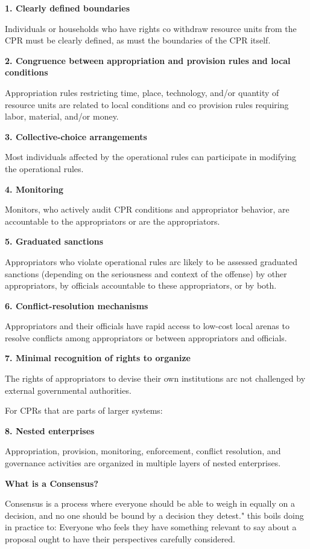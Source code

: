 \documentclass{article}
\begin{document}
\textbf{1. Clearly defined boundaries}

Individuals or households who have rights co withdraw resource units from the CPR must be clearly defined, as must the boundaries of the CPR itself.

\textbf{2. Congruence between appropriation and provision rules and local conditions}

 Appropriation rules restricting time, place, technology, and/or quantity of resource units are related to local conditions and co provision rules requiring labor, material, and/or money.

\textbf{3. Collective-choice arrangements}

Most individuals affected by the operational rules can participate in modifying the operational rules.

\textbf{4. Monitoring}

Monitors, who actively audit CPR conditions and appropriator behavior, are accountable to the appropriators or are the appropriators.

\textbf{5. Graduated sanctions}

Appropriators who violate operational rules arc likely to be assessed graduated sanctions (depending on the seriousness and context of the offense) by other appropriators, by officials accountable to these appropriators, or by both.

\textbf{6. Conflict-resolution mechanisms}

Appropriators and their officials have rapid access to low-cost local arenas to resolve conflicts among appropriators or between appropriators and officials.

\textbf{7. Minimal recognition of rights to organize}

The rights of appropriators to devise their own institutions arc not challenged by external governmental authorities.

For CPRs that are parts of larger systems:

\textbf{8. Nested enterprises}

Appropriation, provision, monitoring, enforcement, conflict resolution, and governance activities are organized in multiple layers of nested enterprises.





\pagebreak
{\huge \textbf{What is a Consensus?}}

Consensus is a process where everyone should be able to weigh in equally on a decision, and no one should be bound by a decision they detest."
this boils doing in practice to: Everyone who feels they have something relevant to say about a proposal ought to have their perspectives carefully considered.
\end{document}
